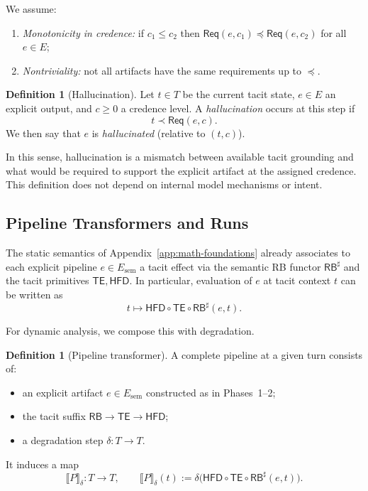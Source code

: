 \documentclass[11pt]{article}
\theoremstyle{definition}
\newtheorem{definition}[theorem]{Definition}
\newcommand{\RB}{\mathsf{RB}}   %
\newcommand{\TE}{\mathsf{TE}}
\newcommand{\HFD}{\mathsf{HFD}}
\newcommand{\Req}{\mathsf{Req}}
\newcommand{\RBsharp}{\RB^{\sharp}}
\begin{document}
We assume:
\begin{enumerate}[label=(R\arabic*),leftmargin=2.2em]
  \item \emph{Monotonicity in credence:} if \(c_1 \le c_2\) then
        \(\Req(e,c_1) \preceq \Req(e,c_2)\) for all \(e\in E\);
  \item \emph{Nontriviality:} not all artifacts have the same
        requirements up to \(\preceq\).
\end{enumerate}

\begin{definition}[Hallucination]
Let \(t\in T\) be the current tacit state, \(e\in E\) an explicit output,
and \(c\ge 0\) a credence level. A \emph{hallucination} occurs at this
step if
\[
t \prec \Req(e,c).
\]
We then say that \(e\) is \emph{hallucinated} (relative to \((t,c)\)).
\end{definition}

In this sense, hallucination is a mismatch between available tacit
grounding and what would be required to support the explicit artifact at
the assigned credence. This definition does not depend on internal model
mechanisms or intent.

\subsection{Pipeline Transformers and Runs}
\label{subsec:phase3-runs}

The static semantics of Appendix~\ref{app:math-foundations} already
associates to each explicit pipeline \(e\in E_{\mathrm{sem}}\) a tacit
effect via the semantic RB functor \(\RBsharp\) and the tacit primitives
\(\TE,\HFD\). In particular, evaluation of \(e\) at tacit context \(t\)
can be written as
\[
t \longmapsto \HFD\circ \TE \circ \RBsharp(e,t).
\]

For dynamic analysis, we compose this with degradation.

\begin{definition}[Pipeline transformer]
A complete pipeline at a given turn consists of:
\begin{itemize}[leftmargin=2em]
  \item an explicit artifact \(e \in E_{\mathrm{sem}}\) constructed as in
        Phases~1–2;
  \item the tacit suffix \(\RB \to \TE \to \HFD\);
  \item a degradation step \(\delta:T\to T\).
\end{itemize}
It induces a map
\[
\llbracket P \rrbracket_\delta : T \to T,\qquad
\llbracket P \rrbracket_\delta(t)
 :=
 \delta\bigl(\HFD\circ\TE\circ\RBsharp(e,t)\bigr).
\]
\end{definition}
\end{document}
